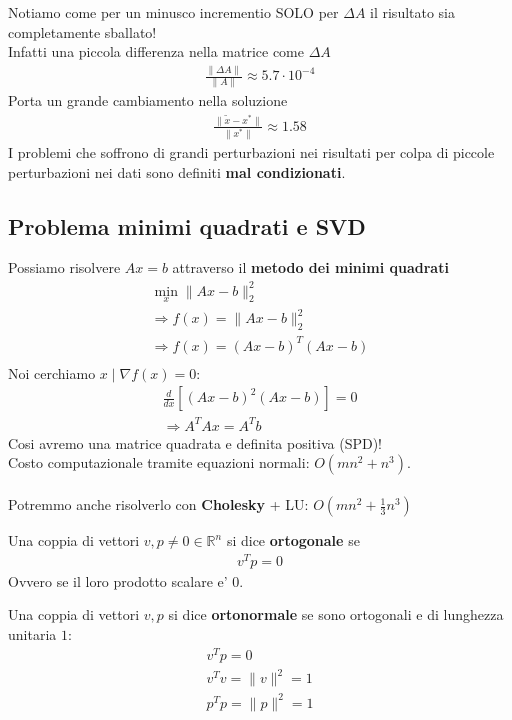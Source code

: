 \documentclass[a4paper,12pt]{article}
\begin{document}
Notiamo come per un minusco incrementio SOLO per $\Delta A$ il risultato sia completamente sballato! \\
Infatti una piccola differenza nella matrice come $\Delta A$
\begin{align*}
    \frac{\| \Delta A\|}{\| A \|} \approx 5.7 \cdot 10^{-4}
\end{align*}
Porta un grande cambiamento nella soluzione
\begin{align*}
    \frac{\| \tilde{x}-x^* \|}{\| x^* \|} \approx 1.58
\end{align*}
I problemi che soffrono di grandi perturbazioni nei risultati per colpa di piccole perturbazioni nei dati sono definiti \textbf{mal condizionati}.
\subsection{Problema minimi quadrati e SVD}
\label{sec:min_quad}
Possiamo risolvere $Ax=b$ attraverso il \textbf{metodo dei minimi quadrati}
\begin{align*}
    \min_x \|Ax-b \|_2^2 \\
    \Rightarrow f(x) = \|Ax-b \|_2^2 \\
    \Rightarrow f(x) = (Ax-b)^T(Ax-b) \\
\end{align*}
Noi cerchiamo $x \mid \nabla f(x)=0$:
\begin{align*}
        \frac{d}{dx}[(Ax-b)^2(Ax-b)] = 0 \\
        \Rightarrow
        \boxed{A^T A x = A^T b}
\end{align*}
Cosi avremo una matrice quadrata e definita positiva (SPD)! \\
Costo computazionale tramite equazioni normali: $O(mn^2 + n^3)$. \\ 
\vspace{1px}\\
Potremmo anche risolverlo con \textbf{Cholesky} + LU: $O(mn^2 + \frac{1}{3}n^3)$
\begin{tcolorbox}[colback=blue!5!white, colframe=blue!75!black]
Una coppia di vettori $v, p \neq 0 \in \mathbb{R}^n$ si dice \textbf{ortogonale} se 
\begin{align*}
    v^T p = 0
\end{align*}
Ovvero se il loro prodotto scalare e' $0$. \\
\end{tcolorbox}
\begin{tcolorbox}[colback=blue!5!white, colframe=blue!75!black]
Una coppia di vettori $v,p$ si dice \textbf{ortonormale} se sono ortogonali e di lunghezza unitaria $1$:
\begin{align*}
    v^T p = 0 \\
    v^T v = \| v \|^2 = 1 \\
    p^T p = \| p \|^2 = 1
\end{align*}
\end{tcolorbox}
\end{document}
